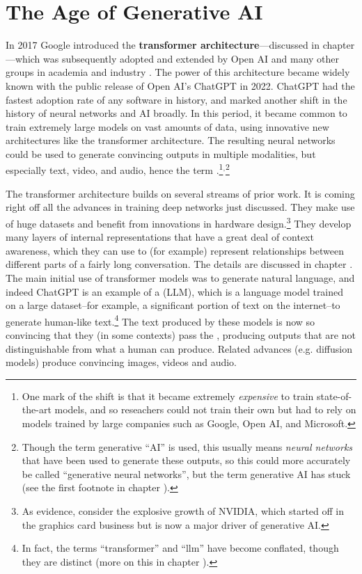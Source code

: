 \section{The Age of Generative AI}\label{age_generative_ai}

In 2017 Google introduced the \textbf{transformer architecture}---discussed in chapter ---which was subsequently adopted and extended by Open AI and many other groups in academia and industry \cite{vaswani2017attention}. The power of this architecture became widely known with the public release of Open AI's ChatGPT in 2022. ChatGPT had the fastest adoption rate of any software in history, and marked another shift in the history of neural networks and AI broadly. In this period, it became common to train extremely large models on vast amounts of data, using innovative new architectures like the transformer architecture. The resulting neural networks could be used to generate convincing outputs in multiple modalities, but especially text, video, and audio, hence the term .\footnote{One mark of the shift is that it became extremely \emph{expensive} to train state-of-the-art models, and so reseachers could not train their own but had to rely on models trained by large companies such as Google, Open AI, and Microsoft.}$^,$\footnote{Though the term generative ``AI'' is used, this usually means \emph{neural networks} that have been used to generate these outputs, so this could more accurately be called ``generative neural networks'', but the term generative AI has stuck (see the first footnote in chapter ).}

The transformer architecture builds on several streams of prior work. It is coming right off all the advances in training deep networks just discussed. They make use of huge datasets and benefit from innovations in hardware design.\footnote{As evidence, consider the explosive growth of NVIDIA, which started off in the graphics card business but is now a major driver of generative AI.} They develop many layers of internal representations that have a great deal of context awareness, which they can use to (for example) represent relationships between different parts of a fairly long conversation. The details are discussed in chapter . The main initial use of transformer models was to generate natural language, and indeed ChatGPT is an example of a  (LLM), which is a language model trained on a large dataset--for example, a significant portion of text on the internet--to generate human-like text.\footnote{In fact, the terms ``transformer'' and ``llm'' have become conflated, though they are distinct (more on this in chapter ).}  The text produced by these models is now so convincing that they (in some contexts) pass the , producing outputs that are not distinguishable from what a human can produce. Related advances (e.g. diffusion models) produce convincing images, videos and audio. 

